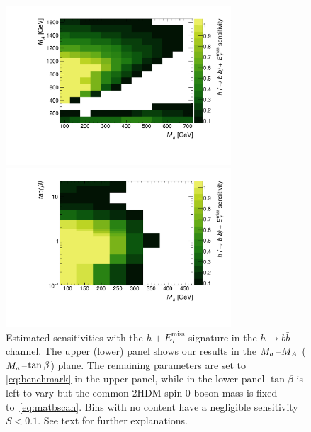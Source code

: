 \documentclass[a4paper, 11pt,notoc]{article}
\newcommand{\MET}{\ensuremath{E_T^\mathrm{miss}}\xspace}
\newcommand{\mA}{\ensuremath{M_{A}}\xspace}
\newcommand{\ma}{\ensuremath{M_{a}}\xspace}
\begin{document}
\begin{figure}[t!]
\centering
\includegraphics[width=0.75\textwidth]{monoHbb_sensi_sum_bins_1_2_3_4_ma_vs_mA_lin.pdf}

\vspace{2mm}

\includegraphics[width=0.75\textwidth]{monoHbb_sensi_sum_bins_1_2_3_4_ma_vs_tanb_lin.pdf}
\vspace{2mm}
\caption{Estimated sensitivities with the $h+\MET$ signature in the $h \to b \bar b$ channel. The upper (lower) panel shows our results in the $\ma\hspace{0.25mm}$--$\hspace{0.25mm}\mA$ ($\ma\hspace{0.25mm}$--$\hspace{0.25mm}\tan \beta$) plane.  The remaining parameters are set to \eqref{eq:benchmark} in the upper panel, while in the lower panel $\tan \beta$ is left to vary but the common 2HDM  spin-0 boson  mass is fixed to~\eqref{eq:matbscan}. Bins with no content have a negligible sensitivity $S<0.1$. See text for further explanations. }
\label{fig:monoHbb_sensi}
\end{figure}
\end{document}
